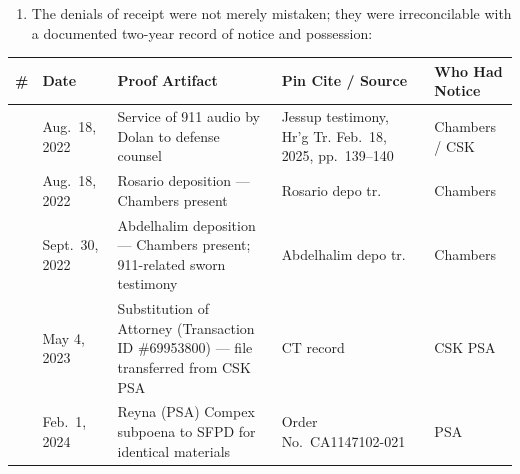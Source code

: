\begin{enumerate}
\def\labelenumi{\arabic{enumi}.}
\setcounter{enumi}{8}
\tightlist
\item
  The denials of receipt were not merely mistaken; they were irreconcilable with a documented two-year record of notice and possession:
\end{enumerate}

{\def\LTcaptype{table} %
\begin{longtable}[]{@{}
  >{\raggedright\arraybackslash}p{}
  >{\raggedright\arraybackslash}p{}
  >{\raggedright\arraybackslash}p{}
  >{\raggedright\arraybackslash}p{}
  >{\raggedright\arraybackslash}p{}@{}}
\toprule\noalign{}
\begin{minipage}[b]{\linewidth}\raggedright
\#
\end{minipage} & \begin{minipage}[b]{\linewidth}\raggedright
Date
\end{minipage} & \begin{minipage}[b]{\linewidth}\raggedright
Proof Artifact
\end{minipage} & \begin{minipage}[b]{\linewidth}\raggedright
Pin Cite / Source
\end{minipage} & \begin{minipage}[b]{\linewidth}\raggedright
Who Had Notice
\end{minipage} \\
\midrule\noalign{}
\endhead
\bottomrule\noalign{}
\endlastfoot
1 & Aug.~18, 2022 & Service of 911 audio by Dolan to defense counsel & Jessup testimony, Hr'g Tr. Feb.~18, 2025, pp.~139--140 & Chambers / CSK \\
2 & Aug.~18, 2022 & Rosario deposition --- Chambers present & Rosario depo tr. & Chambers \\
3 & Sept.~30, 2022 & Abdelhalim deposition --- Chambers present; 911-related sworn testimony & Abdelhalim depo tr. & Chambers \\
4 & May 4, 2023 & Substitution of Attorney (Transaction ID \#69953800) --- file transferred from CSK {\textrightarrow{}} PSA & CT record & CSK {\textrightarrow{}} PSA \\
5 & Feb.~1, 2024 & Reyna (PSA) Compex subpoena to SFPD for identical materials & Order No.~CA1147102-021 & PSA \\

\end{longtable}}
